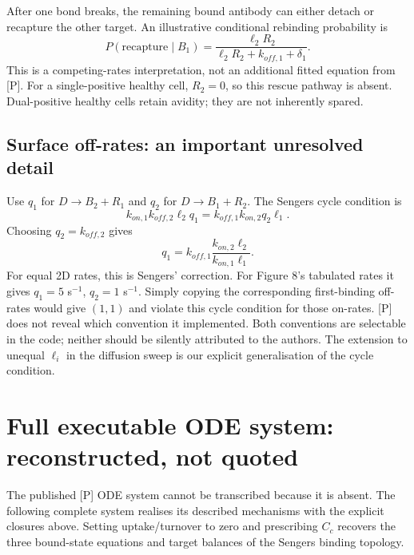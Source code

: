\documentclass[11pt,a4paper]{article}
\begin{document}
After one bond breaks, the remaining bound antibody can either detach or recapture the other target. An illustrative conditional rebinding probability is
\begin{equation}
 P(\mathrm{recapture}\mid B_1)=\frac{\ell_2R_2}{\ell_2R_2+k_{off,1}+\delta_1}.
\end{equation}
This is a competing-rates interpretation, not an additional fitted equation from [P]. For a single-positive healthy cell, $R_2=0$, so this rescue pathway is absent. Dual-positive healthy cells retain avidity; they are not inherently spared.

\subsection{Surface off-rates: an important unresolved detail}
Use $q_1$ for $D\to B_2+R_1$ and $q_2$ for $D\to B_1+R_2$. The Sengers cycle condition is
\begin{equation}
 k_{on,1}k_{off,2}\ell_2q_1
 =k_{off,1}k_{on,2}q_2\ell_1.
\end{equation}
Choosing $q_2=k_{off,2}$ gives
\begin{equation}
 q_1=k_{off,1}\frac{k_{on,2}\ell_2}{k_{on,1}\ell_1}.
\end{equation}
For equal 2D rates, this is Sengers' correction. For Figure 8's tabulated rates it gives $q_1=5$ s$^{-1}$, $q_2=1$ s$^{-1}$. Simply copying the corresponding first-binding off-rates would give $(1,1)$ and violate this cycle condition for those on-rates. [P] does not reveal which convention it implemented. Both conventions are selectable in the code; neither should be silently attributed to the authors. The extension to unequal $\ell_i$ in the diffusion sweep is our explicit generalisation of the cycle condition.

\section{Full executable ODE system: reconstructed, not quoted}
The published [P] ODE system cannot be transcribed because it is absent. The following complete system realises its described mechanisms with the explicit closures above. Setting uptake/turnover to zero and prescribing $C_c$ recovers the three bound-state equations and target balances of the Sengers binding topology.
\end{document}
